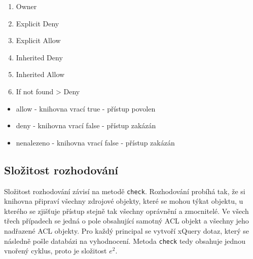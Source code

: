 \begin{enumerate}
\item Owner
\item Explicit Deny
\item Explicit Allow
\item Inherited Deny
\item Inherited Allow
\item If not found > Deny
\end{enumerate}

\begin{itemize}
\item allow - knihovna vrací true - přístup povolen
\item deny - knihovna vrací false - přístup zakázán
\item nenalezeno - knihovna vrací false - přístup zakázán
\end{itemize}

\subsection{Složitost rozhodování}
Složitost rozhodování závisí na metodě \verb|check|. 
Rozhodování probíhá tak, že si knihovna připraví všechny zdrojové objekty, které se mohou týkat objektu, u kterého se zjišťuje přístup stejně tak všechny oprávnění a zmocnitelé. Ve všech třech případech se jedná o pole obsahující samotný ACL objekt a všechny jeho nadřazené ACL objekty. Pro každý principal se vytvoří xQuery dotaz, který se následně pošle databázi na vyhodnocení. Metoda \verb|check| tedy obsahuje jednou vnořený cyklus, proto je složitost $e^2$.
